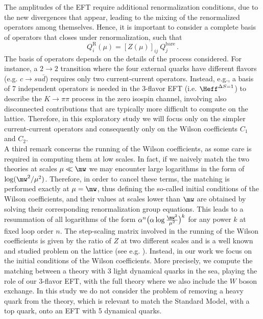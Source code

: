 \documentclass[aps,prd,twocolumn,nofootinbib,showpacs,superscriptaddress]{revtex4-1}
\begin{document}
The amplitudes of the EFT require additional renormalization conditions, 
due to the new divergences that appear,
leading to the mixing of the renormalized operators among themselves. Hence, it is important
to consider a complete basis of operators that closes under renormalization, such that
\begin{equation}
Q_i^\mathrm R(\mu) = [ Z(\mu) ]_{ij} \ Q_j^\mathrm{bare} \,. 
\end{equation}
The basis of operators depends on the details of the process considered. 
For instance, a $2 \to 2$ transition 
where the four external quarks have different flavors (e.g. $c \to s u \bar d$)
requires only two current-current operators. 
Instead, e.g., a basis of 7 independent operators is needed 
in the 3-flavor EFT (i.e. $\Heff^{\Delta S=1}$) to describe 
the $K \to \pi \pi$ process 
in the zero isospin channel,
involving also disconnected contributions that are 
typically more difficult to compute on the lattice.
Therefore, in this exploratory study we will focus only 
on the simpler current-current operators 
and consequently only on the Wilson coefficients $C_1$ and $C_2$.\\

A third remark concerns the running of the Wilson coefficients, 
as some care is required in computing them at low scales.
In fact, if we naively match the two theories
at scales $\mu \ll \mw$ we may encounter large
logarithms in the form of $\log (\mw^2 / \mu^2)$. 
Therefore, in order to cancel these terms, 
the matching is performed exactly at $\mu=\mw$, thus defining the 
so-called initial conditions of the Wilson coefficients, 
and their values at scales lower than $\mw$ 
are obtained by solving their corresponding renormalization group
equations. 
This leads to a resummation of all logarithms of the form 
$\alpha^n \big( \alpha \log \frac{\mw^2}{\mu^2} \big)^k$ for any power $k$
at fixed loop order $n$.
The step-scaling matrix involved in the running of the Wilson coefficients
is given by the ratio of $Z$ at two different scales and is 
a well known and studied problem on the lattice 
(see e.g. ).
Instead, in our work we focus on the 
initial conditions of the Wilson coefficients.
More precisely, we compute the matching between a theory with
3 light dynamical quarks in the sea, playing the role of our 3-flavor EFT, 
with the full theory where we also include the $W$ boson exchange.
In this study we do not consider the problem of removing 
a heavy quark from the theory, which is relevant 
to match the Standard Model, with a top quark, 
onto an EFT with 5 dynamical quarks.\\
\end{document}
